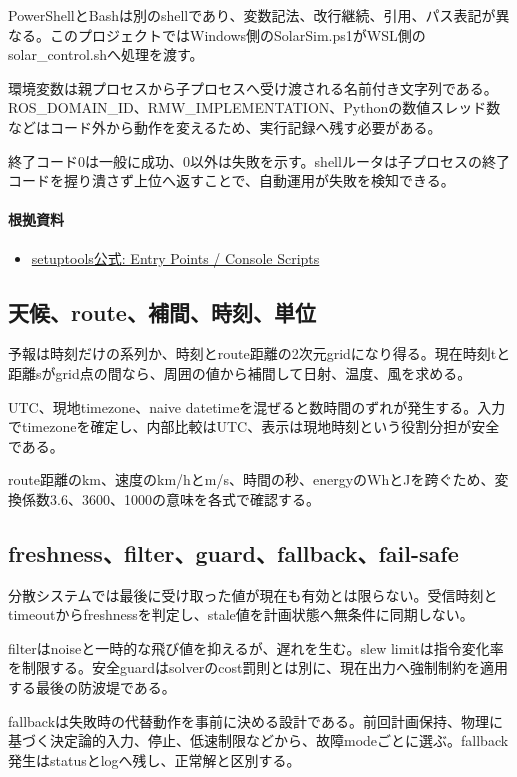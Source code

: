 \documentclass[a4paper,11pt]{article}
\begin{document}
PowerShellとBashは別のshellであり、変数記法、改行継続、引用、パス表記が異なる。このプロジェクトではWindows側のSolarSim.ps1がWSL側のsolar\_control.shへ処理を渡す。


環境変数は親プロセスから子プロセスへ受け渡される名前付き文字列である。ROS\_DOMAIN\_ID、RMW\_IMPLEMENTATION、Pythonの数値スレッド数などはコード外から動作を変えるため、実行記録へ残す必要がある。


終了コード0は一般に成功、0以外は失敗を示す。shellルータは子プロセスの終了コードを握り潰さず上位へ返すことで、自動運用が失敗を検知できる。

\paragraph{根拠資料}
\begin{itemize}[leftmargin=1.6em]
\item \href{https://setuptools.pypa.io/en/latest/userguide/entry_point.html}{setuptools公式: Entry Points / Console Scripts}
\end{itemize}

\subsection{天候、route、補間、時刻、単位}
予報は時刻だけの系列か、時刻とroute距離の2次元gridになり得る。現在時刻tと距離sがgrid点の間なら、周囲の値から補間して日射、温度、風を求める。


UTC、現地timezone、naive datetimeを混ぜると数時間のずれが発生する。入力でtimezoneを確定し、内部比較はUTC、表示は現地時刻という役割分担が安全である。


route距離のkm、速度のkm/hとm/s、時間の秒、energyのWhとJを跨ぐため、変換係数3.6、3600、1000の意味を各式で確認する。



\subsection{freshness、filter、guard、fallback、fail-safe}
分散システムでは最後に受け取った値が現在も有効とは限らない。受信時刻とtimeoutからfreshnessを判定し、stale値を計画状態へ無条件に同期しない。


filterはnoiseと一時的な飛び値を抑えるが、遅れを生む。slew limitは指令変化率を制限する。安全guardはsolverのcost罰則とは別に、現在出力へ強制制約を適用する最後の防波堤である。


fallbackは失敗時の代替動作を事前に決める設計である。前回計画保持、物理に基づく決定論的入力、停止、低速制限などから、故障modeごとに選ぶ。fallback発生はstatusとlogへ残し、正常解と区別する。
\end{document}
